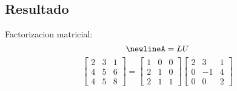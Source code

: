 \documentclass{article}%
\begin{document}
%
\subsection{Resultado}%
\label{subsec:Resultado}%
Factorizacion matricial:%
\[%
\newline%
 A     = L       U%
\]%
\[%
\left[\begin{matrix}2 & 3 & 1\\4 & 5 & 6\\4 & 5 & 8\end{matrix}\right] = \left[\begin{matrix}1 & 0 & 0\\2 & 1 & 0\\2 & 1 & 1\end{matrix}\right] \left[\begin{matrix}2 & 3 & 1\\0 & -1 & 4\\0 & 0 & 2\end{matrix}\right]%
\]

%
\end{document}
